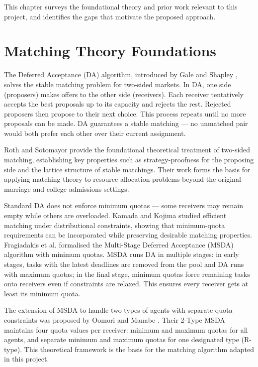 \noindent This chapter surveys the foundational theory and prior work relevant to this project, and identifies the gaps that motivate the proposed approach.

\section{Matching Theory Foundations}

The Deferred Acceptance (DA) algorithm, introduced by Gale and Shapley \cite{gale1962college}, solves the stable matching problem for two-sided markets. In DA, one side (proposers) makes offers to the other side (receivers). Each receiver tentatively accepts the best proposals up to its capacity and rejects the rest. Rejected proposers then propose to their next choice. This process repeats until no more proposals can be made. DA guarantees a stable matching --- no unmatched pair would both prefer each other over their current assignment.

Roth and Sotomayor \cite{roth1990twosided} provide the foundational theoretical treatment of two-sided matching, establishing key properties such as strategy-proofness for the proposing side and the lattice structure of stable matchings. Their work forms the basis for applying matching theory to resource allocation problems beyond the original marriage and college admissions settings.

Standard DA does not enforce minimum quotas --- some receivers may remain empty while others are overloaded. Kamada and Kojima \cite{kamada2015efficient} studied efficient matching under distributional constraints, showing that minimum-quota requirements can be incorporated while preserving desirable matching properties. Fragiadakis et al. \cite{fragiadakis2016strategyproof} formalised the Multi-Stage Deferred Acceptance (MSDA) algorithm with minimum quotas. MSDA runs DA in multiple stages: in early stages, tasks with the latest deadlines are removed from the pool and DA runs with maximum quotas; in the final stage, minimum quotas force remaining tasks onto receivers even if constraints are relaxed. This ensures every receiver gets at least its minimum quota.

The extension of MSDA to handle two types of agents with separate quota constraints was proposed by Oomori and Manabe \cite{oomori2026strategyproof}. Their 2-Type MSDA maintains four quota values per receiver: minimum and maximum quotas for all agents, and separate minimum and maximum quotas for one designated type (R-type). This theoretical framework is the basis for the matching algorithm adapted in this project.

